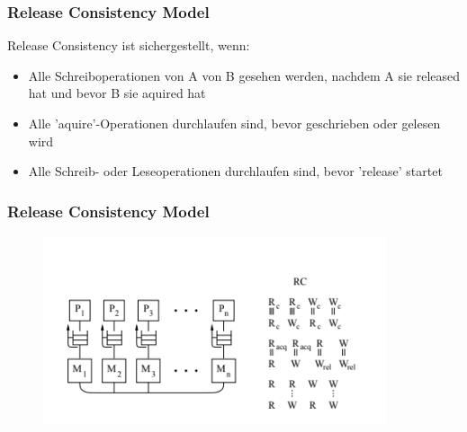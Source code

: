 \documentclass{sikslides}
\begin{document}
\begin{frame}
	\frametitle{Release Consistency Model}
Release Consistency ist sichergestellt, wenn:
	\begin{itemize}
\bigskip
		\item Alle Schreiboperationen von A von B gesehen werden, nachdem A sie released hat und bevor B sie aquired hat \bigskip
		\item Alle 'aquire'-Operationen durchlaufen sind, bevor geschrieben oder gelesen wird \bigskip
		\item Alle Schreib- oder Leseoperationen durchlaufen sind, bevor 'release' startet 

	\end{itemize}


\end{frame}


\begin{frame}
	\frametitle{Release Consistency Model}
\begin{figure}[htbp] 
  \centering
  \includegraphics[width=0.9\textwidth]{figures/rc.png}
  \label{Fig:weak}
\end{figure}

\end{frame}
\end{document}
